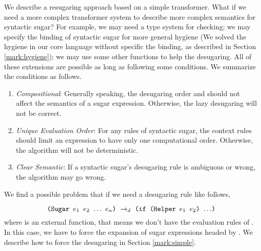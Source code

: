 We describe a resugaring approach based on a simple transformer. What if we need a more complex transformer system to describe more complex semantics for syntactic sugar? For example, we may need a type system for checking; we may specify the binding of syntactic sugar for more general hygiene (We solved the hygiene in our core language without specific the binding, as described in Section \ref{mark:hygiene}); we may use some other functions to help the desugaring. All of these extensions are possible as long as following some conditions. We summarize the conditions as follows.
\begin{enumerate}
	\item \emph{Compositional}: Generally speaking, the desugaring order and should not affect the semantics of a sugar expression. Otherwise, the lazy desugaring will not be correct.
	\item \emph{Unique Evaluation Order}: For any rules of syntactic sugar, the context rules should limit an expression to have only one computational order. Otherwise, the algorithm  will not be deterministic.
	\item \emph{Clear Semantic}: If a syntactic sugar's desugaring rule is ambiguous or wrong, the algorithm  may go wrong.
\end{enumerate}

We find a possible problem that if we need a desugaring rule like follows,

\[
\texttt{(Sugar $e_1$ $e_2$ $\ldots$ $e_n$)} ~\rightarrow_d~ \texttt{(if (Helper $e_1$ $e_2$) $\ldots$)}
\]
where  is an external function, that means we don't have the evaluation rules of . In this case, we have to force the expansion of sugar expressions headed by . We describe how to force the desugaring in Section \ref{mark:simple}.
